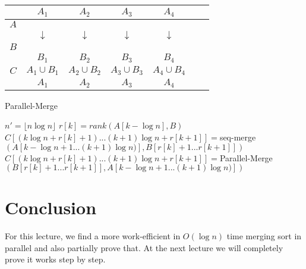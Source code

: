 \documentclass[11pt]{article}
\begin{document}
\begin{center}
\begin{tabular}{ |c|c|c|c|c|c|c| }
  \multicolumn{1}{c}{} &
  \multicolumn{1}{c}{$A_1$} &
  \multicolumn{1}{c}{$A_2$} &
  \multicolumn{1}{c}{$A_3$} &
  \multicolumn{1}{c}{$A_4$} &
  \multicolumn{1}{c}{}\\
\hline
 $A$  & & & & & & \\
 \hline
  \multicolumn{1}{c}{} &
  \multicolumn{1}{c}{$\downarrow$} &
  \multicolumn{1}{c}{$\downarrow$} &
  \multicolumn{1}{c}{$\downarrow$} &
  \multicolumn{1}{c}{$\downarrow$} &
  \multicolumn{1}{c}{} \\
 \hline
 $B$ & & & & & & \\
 \hline
 \multicolumn{1}{c}{} &
 \multicolumn{1}{c}{$B_1$} &
 \multicolumn{1}{c}{$B_2$} &
 \multicolumn{1}{c}{$B_3$} &
 \multicolumn{1}{c}{$B_4$} &
 \multicolumn{1}{c}{} \\
 \hline
 $C$  & $A_1 \cup B_1$ &$A_2 \cup B_2$  &$A_3 \cup B_3$  & $A_4 \cup B_4$ & & \\
 \hline
 \multicolumn{1}{c}{} &
 \multicolumn{1}{c}{$A_1$} &
 \multicolumn{1}{c}{$A_2$} &
 \multicolumn{1}{c}{$A_3$} &
 \multicolumn{1}{c}{$A_4$} &
 \multicolumn{1}{c}{}\\

\end{tabular}
\end{center}


\begin{algorithm}
\caption{Parallel-Merge}
\begin{algorithmic}
\STATE $n' = \lfloor n \log n \rfloor$
  \STATE $r[k] = rank( A[k - \log n] , B)$
  \STATE $C[(k\log n + r[k] + 1) ... (k+1)\log n + r[k+1]] = $seq-merge$(A[k-\log n +1...(k+1)\log n)], B[r[k] + 1 ... r[k + 1]])$
  \ELSE
  \STATE $C[(k\log n + r[k] + 1) ... (k+1)\log n + r[k+1]] = $Parallel-Merge$(B[r[k] + 1 ... r[k + 1]] , A[k-\log n +1...(k+1)\log n)])$
  \ENDIF
\ENDFOR
\end{algorithmic}
\end{algorithm}

\section{Conclusion}
For this lecture, we find a more work-efficient in $O(\log n)$ time merging sort in parallel and also partially prove that.  At the next lecture we will completely prove it works step by step.

%

\end{document}
